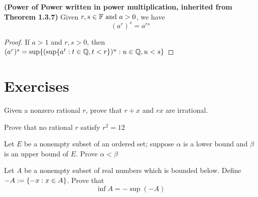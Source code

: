\documentclass{report}
\begin{document}
\begin{theorem}
\textbf{(Power of Power written in power multiplication, inherited from Theorem 1.3.7)} Given $r,s\in\mathbb{F}\text{ and }a>0$, we have
\begin{equation}
  (a^r)^s=a^{rs}
\end{equation}
\end{theorem}
\begin{proof}
If $a>1$ and  $r,s>0$, then  $(a^r)^s=\sup \{ (\sup \{ a^t:t\in\mathbb{Q},t<r \})^u:u\in\mathbb{Q},u<s \}$
\end{proof}
\section{Exercises}
\begin{question}{}{}
Given a nonzero rational $r$, prove that $r+x$ and $rx$ are irrational. 
\end{question}
\begin{question}{}{}
Prove that no rational $r$ satisfy  $r^2=12$
\end{question}
\begin{question}{}{}
Let $E$ be a nonempty subset of an ordered set; suppose $\alpha$ is a lower bound and $\beta$ is an upper bound of $E$. Prove $\alpha<\beta$ 
\end{question}
\begin{question}{}{}
Let $A$ be a nonempty subset of real numbers which is bounded below.  Define $-A:=\{ -x: x\in A \}$. Prove that
\begin{equation}
\inf A=-\sup (-A)
\end{equation}
\end{question}
\end{document}

